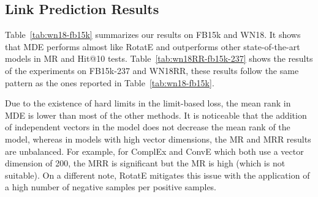 \documentclass{ecai}
\begin{document}
\subsection{Link Prediction Results}

Table~\ref{tab:wn18-fb15k} summarizes our results on FB15k and WN18.
It shows that MDE performs almost like RotatE and outperforms other state-of-the-art models in MR and Hit@10 tests. Table~\ref{tab:wn18RR-fb15k-237} shows the results of the experiments on FB15k-237 and WN18RR, these results follow the same pattern as the ones reported in Table~\ref{tab:wn18-fb15k}. 





Due to the existence of hard limits in the limit-based loss, the mean rank in MDE is lower than most of the other methods. It is noticeable that the addition of independent vectors in the model does not decrease the mean rank of the model, whereas in models with high vector dimensions, the MR and MRR results are unbalanced.
For example, for ComplEx and ConvE which both use a vector dimension of 200, the MRR is significant but the MR is high (which is not suitable). On a different note, RotatE mitigates this issue with the application of a high number of negative samples per positive samples.

\begin{table}\centering
{}
    \caption{Results on WN18RR and FB15k-237. Best ones are in bold.}
\label{tab:wn18RR-fb15k-237}
\end{table}
\end{document}

